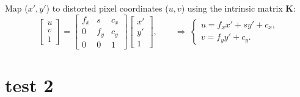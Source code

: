 \documentclass{erauthesis}
\begin{document}
Map ($x', y'$) to distorted pixel coordinates ($u,v$) using the intrinsic matrix $\mathbf{K}$:
\begin{equation}
\begin{bmatrix} u \\ v \\ 1 \end{bmatrix}
=
\begin{bmatrix}
f_x & s & c_x \\
0   & f_y & c_y \\
0   & 0   & 1
\end{bmatrix}
\begin{bmatrix} x' \\ y' \\ 1 \end{bmatrix},
\qquad
\Rightarrow\ 
\begin{cases}
u = f_x x' + s y' + c_x,\\
v = f_y y' + c_y.
\end{cases}
\label{eq:intrinsics_to_pixels}
\end{equation}
\chapter{test 2}


\end{document}
